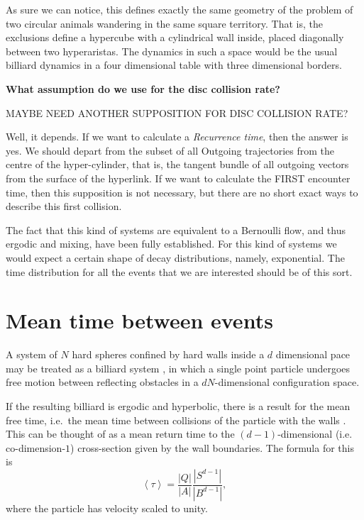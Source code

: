 \documentclass[a4paper,10pt]{article}
\newcommand{\mean}[1]{\left \langle #1 \right \rangle}
\begin{document}
As sure we can notice, this defines exactly the same geometry of
the problem of two circular animals wandering in the same square territory. That is,
the exclusions define a hypercube with a cylindrical wall inside, placed
diagonally between two hyperaristas. The dynamics in such a space
would be the usual billiard dynamics in a four dimensional table with
three dimensional borders.

\textbf{What assumption do we use for the disc collision rate?}

MAYBE NEED ANOTHER SUPPOSITION FOR DISC COLLISION RATE?

Well, it depends. If we want to calculate a \emph{Recurrence time}, 
then the answer is yes.
We should depart from the subset of all Outgoing trajectories from the centre of the
hyper-cylinder, that is, the tangent bundle of all outgoing vectors from 
the surface of the hyperlink. If we want to calculate the FIRST encounter time, then
this supposition is not necessary, 
but there are no short exact ways to describe this first collision. 

The fact that this kind of systems are equivalent to a Bernoulli flow,
and thus ergodic and mixing, have been fully established. For this kind
of systems we would expect a certain shape of decay distributions, namely, 
exponential. The time distribution for all the events that we are
interested should be of this sort.  


\section{Mean time between events}

A system of $N$ hard spheres confined by hard walls inside a $d$ dimensional
pace may be treated as a billiard system \cite{Sinai70, MarkChern}, 
in which a single point  particle undergoes free motion between reflecting obstacles 
in a $ d N $-dimensional configuration space. 

If the resulting billiard is ergodic and hyperbolic, 
there is a result for the mean free time, i.e.\ the mean time between 
collisions of the particle with the walls \cite{MarkChern}. 
This can be thought of as a mean return time to the $(d-1)$-dimensional 
(i.e. co-dimension-$1$) cross-section given by the wall boundaries.
The formula for this is
\begin{equation}
 \mean{\tau} = \frac{|Q|}{|A|} \frac{|S^{d-1}|}{|B^{d-1}|},
\end{equation}
where the particle has velocity scaled to unity.
\end{document}
